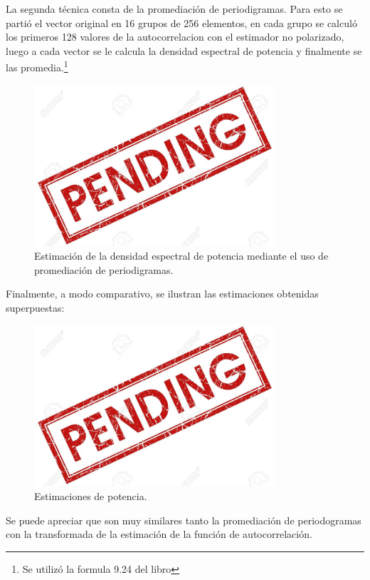 La segunda técnica consta de la promediación de periodigramas. Para esto se partió el vector original en 16 grupos de 256 elementos, en cada grupo se calculó los primeros 128 valores de la autocorrelacion con el estimador no polarizado, luego a cada vector se le calcula la densidad espectral de potencia y finalmente se las promedia.\footnote{Se utilizó la formula 9.24 del libro}
\begin{figure}[H]
\centering
	\includegraphics[width=0.8\textwidth, trim = {0 0 0 0},clip]{./Imagenes/pend.jpg}
	\caption{Estimación de la densidad espectral de potencia mediante el uso de promediación de periodigramas.}
	\label{fig:fft-calc}
\end{figure}

Finalmente, a modo comparativo, se ilustran las estimaciones obtenidas superpuestas:
\begin{figure}[H]
\centering
	\includegraphics[width=0.8\textwidth, trim = {0 0 0 0},clip]{./Imagenes/pend.jpg}
	\caption{Estimaciones de potencia.}
	\label{fig:fft2}
\end{figure}
Se puede apreciar que son muy similares tanto la promediación de periodogramas con la transformada de la estimación de la función de autocorrelación.

